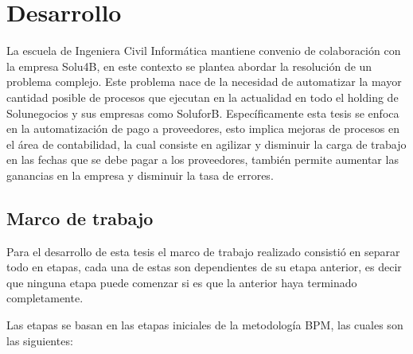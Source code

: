 \chapter{Desarrollo}
\newpage
La escuela de Ingeniera Civil Informática mantiene convenio de colaboración con la empresa Solu4B, en este contexto se plantea abordar la resolución de un problema complejo. Este problema nace de la necesidad de automatizar la mayor cantidad posible de procesos que ejecutan en la actualidad en todo el holding de Solunegocios y sus empresas como SoluforB. Específicamente esta tesis se enfoca en la automatización de pago a proveedores, esto implica mejoras de procesos en el área de contabilidad, la cual consiste en agilizar y disminuir la carga de trabajo en las fechas que se  debe pagar a los proveedores, también permite aumentar las ganancias en la empresa y disminuir la tasa de errores.

	\section{Marco de trabajo}
	Para el desarrollo de esta tesis el marco de trabajo realizado consistió en separar todo en etapas, cada una de estas son dependientes de su etapa anterior, es decir que ninguna etapa puede comenzar si es que la anterior haya terminado completamente. 
	\newline
	\par
	Las etapas se basan en las etapas iniciales de la metodología BPM, las cuales son las siguientes:
	
